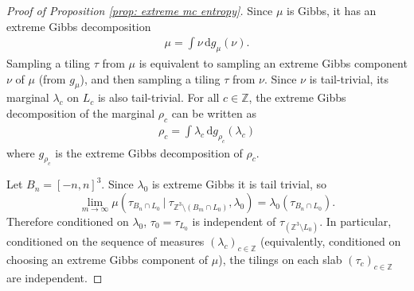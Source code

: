 \documentclass[11pt]{article}
\theoremstyle{remark}
\theoremstyle{definition}
\newcommand{\Z}{\mathbb{Z}}
\newcommand{\m}[1]{\mathbb{#1}}
\newcommand{\dd}{\mathrm{d}}
\begin{document}
\begin{proof}[Proof of Proposition \ref{prop: extreme mc entropy}] 
Since $\mu$ is Gibbs, it has an extreme Gibbs decomposition 
\begin{align*}
    \mu = \int \nu \, \dd g_\mu(\nu). 
\end{align*}
Sampling a tiling $\tau$ from $\mu$ is equivalent to sampling an extreme Gibbs component $\nu$ of $\mu$ (from $g_\mu$), and then sampling a tiling $\tau$ from $\nu$. Since $\nu$ is tail-trivial, its marginal $\lambda_c$ on $L_c$ is also tail-trivial. For all $c\in \m Z$, the extreme Gibbs decomposition of the marginal $\rho_c$ can be written as
\begin{align*}
    \rho_c = \int \lambda_c \, \dd g_{\rho_c}(\lambda_c)
\end{align*}
where $g_{\rho_c}$ is the extreme Gibbs decomposition of $\rho_c$.

Let $B_n = [-n,n]^3$. Since $\lambda_0$ is extreme Gibbs it is tail trivial, so
    $$\lim_{m\to \infty}\mu(\tau_{B_n\cap L_0}~|~\tau_{\Z^3\setminus (B_m\cap L_0)},\lambda_0)=\lambda_0(\tau_{B_n\cap L_0}).$$
    Therefore conditioned on $\lambda_0$, $\tau_0 = \tau_{L_0}$ is independent of $\tau_{(\m Z^3\setminus L_0)}$. In particular, conditioned on the sequence of measures $(\lambda_c)_{c\in \m Z}$ (equivalently, conditioned on choosing an extreme Gibbs component of $\mu$), the tilings on each slab $(\tau_c)_{c\in \m Z}$ are independent.


\end{proof}
\end{document}
